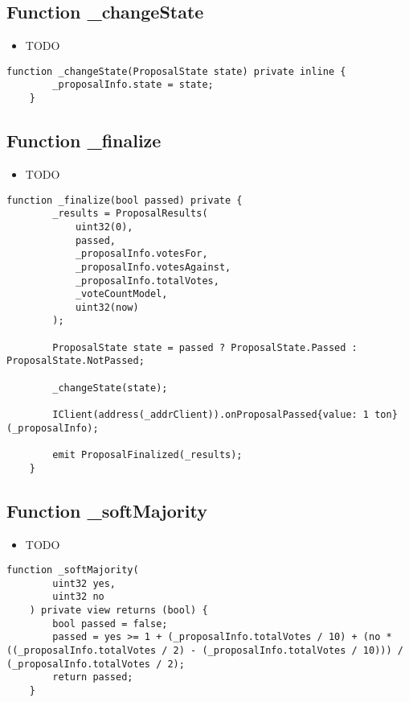 \subsection{Function \_{}changeState}

\begin{itemize}
\item TODO
\end{itemize}

\begin{lstlisting}[firstnumber=150]
    function _changeState(ProposalState state) private inline {
        _proposalInfo.state = state;
    }
\end{lstlisting}

\subsection{Function \_{}finalize}

\begin{itemize}
\item TODO
\end{itemize}

\begin{lstlisting}[firstnumber=81]
    function _finalize(bool passed) private {
        _results = ProposalResults(
            uint32(0),
            passed,
            _proposalInfo.votesFor,
            _proposalInfo.votesAgainst,
            _proposalInfo.totalVotes,
            _voteCountModel,
            uint32(now)
        );

        ProposalState state = passed ? ProposalState.Passed : ProposalState.NotPassed;

        _changeState(state);

        IClient(address(_addrClient)).onProposalPassed{value: 1 ton} (_proposalInfo);

        emit ProposalFinalized(_results);
    }
\end{lstlisting}

\subsection{Function \_{}softMajority}

\begin{itemize}
\item TODO
\end{itemize}

\begin{lstlisting}[firstnumber=141]
    function _softMajority(
        uint32 yes,
        uint32 no
    ) private view returns (bool) {
        bool passed = false;
        passed = yes >= 1 + (_proposalInfo.totalVotes / 10) + (no * ((_proposalInfo.totalVotes / 2) - (_proposalInfo.totalVotes / 10))) / (_proposalInfo.totalVotes / 2);
        return passed;
    }
\end{lstlisting}

